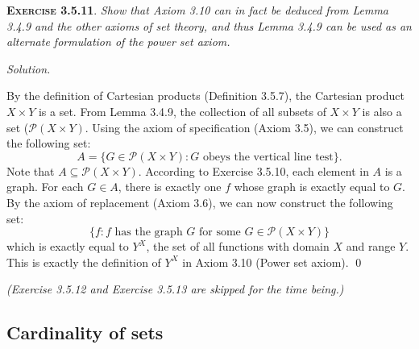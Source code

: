 \documentclass[12pt]{article}
\theoremstyle{remark}
\newenvironment{exer}[2]{
    \noindent \setlength{\parskip}{1em}%
    \textsc{\textbf{Exercise #1}}. \textit{#2} \par
    \noindent \textit{Solution.} %
}{\bigskip}
\begin{document}
\begin{exer}{3.5.11}{
    Show that Axiom 3.10 can in fact be deduced from Lemma 3.4.9 and the other axioms of set theory, and thus Lemma 3.4.9 can be used as an alternate formulation of the power set axiom.
}
    By the definition of Cartesian products (Definition 3.5.7), the Cartesian product $X \times Y$ is a set.
    From Lemma 3.4.9, the collection of all subsets of $X \times Y$ is also a set ($\mathcal{P}(X \times Y)$.
    Using the axiom of specification (Axiom 3.5), we can construct the following set:
    \[
        A = \{ G \in \mathcal{P}(X \times Y) : G \text{ obeys the vertical line test}\}.
    \]
    Note that $A \subseteq \mathcal{P}(X \times Y)$.
    According to Exercise 3.5.10, each element in $A$ is a graph.
    For each $G \in A$, there is exactly one $f$ whose graph is exactly equal to $G$.
    By the axiom of replacement (Axiom 3.6), we can now construct the following set:
    \[
        \{f : f \text{ has the graph } G \text{ for some } G \in \mathcal{P}(X \times Y) \}
    \]
    which is exactly equal to $Y^X$, the set of all functions with domain $X$ and range $Y$.
    This is exactly the definition of $Y^X$ in Axiom 3.10 (Power set axiom). \qed
\end{exer}


\textit{(Exercise 3.5.12 and Exercise 3.5.13 are skipped for the time being.)}


\subsection{Cardinality of sets}
\end{document}
